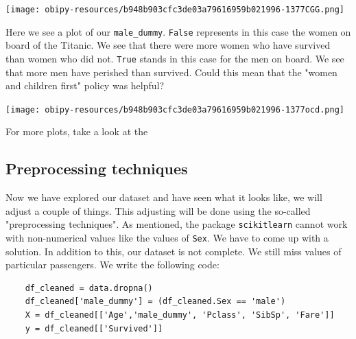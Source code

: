 \documentclass[11pt]{article}
\begin{document}
\begin{center}
\texttt{[image: obipy-resources/b948b903cfc3de03a79616959b021996-1377CGG.png]}
\end{center}

Here we see a plot of our \texttt{male\_dummy}. \texttt{False} represents in this case the women on board of the Titanic. We see that there were more women who have survived than women who did not. \texttt{True} stands in this case for the men on board. We see that more men have perished than survived. Could this mean that the "women and children first" policy was helpful? 
\begin{center}
\texttt{[image: obipy-resources/b948b903cfc3de03a79616959b021996-1377ocd.png]}
\end{center}

For more plots, take a look at the  



\subsection{Preprocessing techniques}
\label{sec:org6fc81c6}

Now we have explored our dataset and have seen what it looks like, we will adjust a couple of things. This adjusting will be done using the so-called "preprocessing techniques". As mentioned, the package \texttt{scikitlearn} cannot work with non-numerical values like the values of \texttt{Sex}. We have to come up with a solution. In addition to this, our dataset is not complete. We still miss values of particular passengers. We write the following code:

\begin{verbatim}
    df_cleaned = data.dropna()
    df_cleaned['male_dummy'] = (df_cleaned.Sex == 'male') 
    X = df_cleaned[['Age','male_dummy', 'Pclass', 'SibSp', 'Fare']]
    y = df_cleaned[['Survived']]
\end{verbatim}
\end{document}
